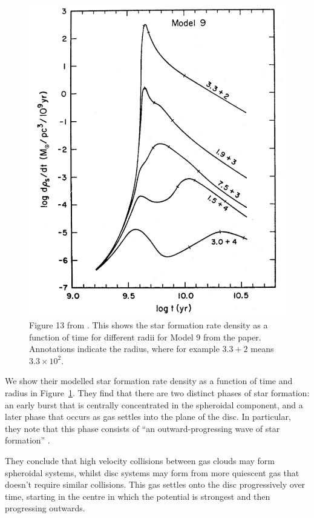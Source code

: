\documentclass[preprint2]{aastex631}
\begin{document}
\begin{figure}[htb]
    \centering
    \includegraphics[width=\columnwidth]{larson1976_fig13.png}
    \caption{Figure 13 from \citet{Larson+1976}. This shows the star formation rate density as a function of time for different radii for Model 9 from the paper. Annotations indicate the radius, where for example $3.3+2$ means $3.3 \times 10^2$.}
    \label{fig:larson76}
\end{figure}

We show their modelled star formation rate density as a function of time and radius in Figure~\ref{fig:larson76}. They find that there are two distinct phases of star formation: an early burst that is centrally concentrated in the spheroidal component, and a later phase that occurs as gas settles into the plane of the disc. In particular, they note that this phase consists of ``an outward-progressing wave of star formation'' \citep{Larson+1976}.

They conclude that high velocity collisions between gas clouds may form spheroidal systems, whilst disc systems may form from more quiescent gas that doesn't require similar collisions. This gas settles onto the disc progressively over time, starting in the centre in which the potential is strongest and then progressing outwards.
\end{document}
